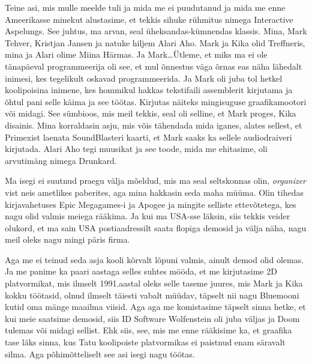Teine asi, mis mulle meelde tuli ja mida me ei puudutanud ja mida me enne Ameerikasse minekut alustasime, et tekkis sihuke rühmitus nimega Interactive Aspelungs. See juhtus, ma arvan, seal üheksandas-kümnendas klassis.  Mina, Mark Tehver, Kristjan Jansen ja natuke hiljem Alari Aho. Mark ja Kika olid Treffneris, mina ja Alari olime Miina Härmas. Ja Mark\ldots Ütleme, et miks ma ei ole tänapäeval programmeerija oli see, et mul õnnestus väga õrnas eas näha lähedalt inimesi, kes tegelikult oskavad programmeerida. Ja Mark oli juba tol hetkel koolipoisina inimene, kes hommikul hakkas tekstifaili assemblerit kirjutama ja õhtul pani selle käima ja see töötas. Kirjutas näiteks mingisuguse graafikamootori või midagi. See sümbioos, mis meil tekkis, seal oli selline, et Mark proges, Kika disainis. Mina korraldasin asju, mis võis tähendada mida iganes, alates sellest, et Primexist laenata SoundBlasteri kaarti, et Mark saaks ka sellele audiodraiveri kirjutada. Alari Aho tegi muusikat ja see toode, mida me ehitasime, oli arvutimäng nimega Drunkard.

Ma isegi ei suutnud praegu välja mõeldud, mis ma seal seltskonnas olin, \emph{organizer} vist neis ametlikes paberites, aga  mina hakkasin seda maha müüma. Olin tihedas kirjavahetuses Epic Megagames-i ja Apogee ja mingite selliste ettevõtetega, kes nagu  olid valmis meiega rääkima.  Ja kui ma USA-sse läksin, siis tekkis  veider olukord, et ma sain USA postiaadressilt saata flopiga demosid ja välja näha, nagu meil oleks nagu mingi päris firma. 

Aga me ei teinud seda asja kooli kõrvalt lõpuni valmis, ainult demod olid olemas. Ja me panime ka paari aastaga selles suhtes mööda, et me kirjutasime 2D platvormikat, mis ilmselt 1991.aastal oleks selle taseme juures, mis Mark ja Kika  kokku töötasid, olnud ilmselt täiesti vabalt müüdav, täpselt nii nagu Bluemooni kutid oma mänge maailma viisid. Aga aga me komistasime täpselt sinna hetke, et kui meie saatsime demosid, siis  ID Software Wolfenstein oli juba väljas ja Doom tulemas või midagi sellist. Ehk siis, see, mis me enne rääkisime ka, et graafika tase läks sinna, kus Tatu koolipoiste platvormikas ei paistnud enam säravalt silma. Aga põhimõtteliselt see asi isegi nagu töötas.

